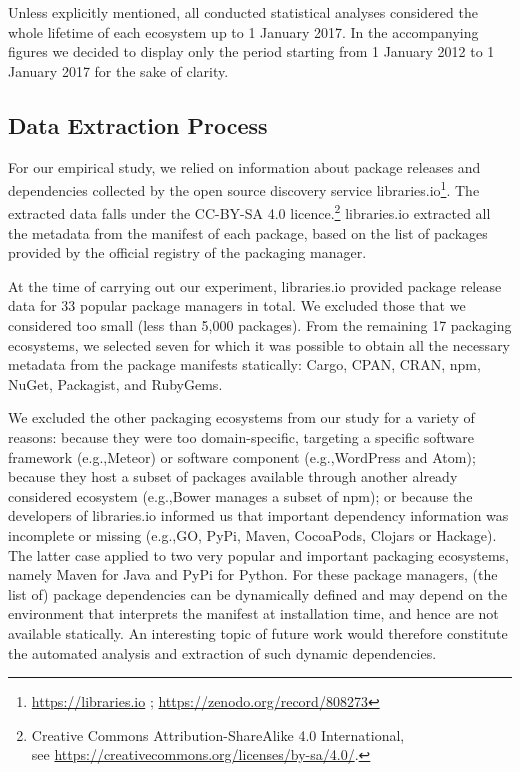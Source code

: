 \documentclass[smallextended]{svjour3}       %
\newcommand{\eg}{e.g.,\xspace}
\newcommand{\cran}{\textsf{CRAN}\xspace}
\newcommand{\cpan}{\textsf{CPAN}\xspace}
\newcommand{\rubygems}{\textsf{RubyGems}\xspace}
\newcommand{\packagist}{\textsf{Packagist}\xspace}
\newcommand{\cargo}{\textsf{Cargo}\xspace}
\newcommand{\nuget}{\textsf{NuGet}\xspace}
\newcommand{\npm}{\textsf{npm}\xspace}
\begin{document}
Unless explicitly mentioned, all conducted statistical analyses considered the whole lifetime of each ecosystem up to 1 January 2017. 
In the accompanying figures we decided to display only the period starting from 1 January 2012 to 1 January 2017 for the sake of clarity. 

\subsection{Data Extraction Process}

For our empirical study, we relied on information about package releases and dependencies collected by the open source discovery service \textsf{libraries.io}\footnote{\url{https://libraries.io} ; \url{https://zenodo.org/record/808273}}. 
The extracted data falls under the CC-BY-SA 4.0 licence.\footnote{Creative Commons Attribution-ShareAlike 4.0 International,\\ see \url{https://creativecommons.org/licenses/by-sa/4.0/}.}
%
\textsf{libraries.io} extracted all the metadata from the manifest of each package, based on the list of packages provided by the official registry of the packaging manager.

At the time of carrying out our experiment, \textsf{libraries.io} provided package release data for 33 popular package managers in total.
We excluded those that we considered too small (less than 5,000 packages). From the remaining 17 packaging ecosystems, we selected seven for which it was possible to obtain all the necessary metadata from the package manifests statically: \cargo, \cpan, \cran, \npm, \nuget, \packagist, and \rubygems.

We excluded the other packaging ecosystems from our study for a variety of reasons:
because they were too domain-specific, targeting a specific software framework (\eg \textsf{Meteor}) or software component (\eg \textsf{WordPress} and \textsf{Atom}); because they host a subset of packages available through another already considered ecosystem (\eg \textsf{Bower} manages a subset of \npm); or because the developers of \textsf{libraries.io} informed us that important dependency information was incomplete or missing (\eg \textsf{GO, PyPi, Maven, CocoaPods, Clojars} or \textsf{Hackage}).
The latter case applied to two very popular and important packaging ecosystems, namely \textsf{Maven} for Java and \textsf{PyPi} for Python. For these package managers,  (the list of) package dependencies can be dynamically defined and may depend on the environment that interprets the manifest at installation time, and hence are not available statically. An interesting topic of future work would therefore constitute the automated analysis and extraction of such dynamic dependencies.
\end{document}
